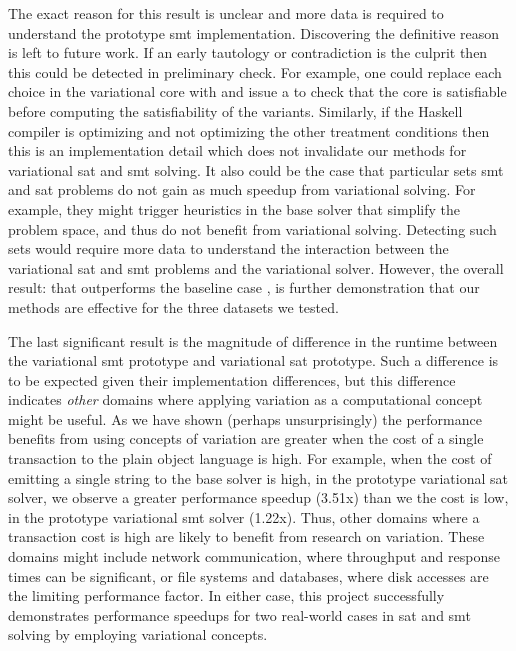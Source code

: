 The exact reason for this result is unclear and more data is required to
understand the prototype \ac{smt} implementation. Discovering the definitive
reason is left to future work. If an early tautology or contradiction is the
culprit then this could be detected in preliminary check. For example, one could
replace each choice in the variational core with \tru{} and issue a
 to check that the core is satisfiable before computing the
satisfiability of the variants. Similarly, if the Haskell compiler is optimizing
\pTov{} and not optimizing the other treatment conditions then this is an
implementation detail which does not invalidate our methods for variational
\ac{sat} and \ac{smt} solving. It also could be the case that particular sets
\ac{smt} and \ac{sat} problems do not gain as much speedup from variational
solving. For example, they might trigger heuristics in the base solver that
simplify the problem space, and thus do not benefit from variational solving.
Detecting such sets would require more data to understand the interaction
between the variational \ac{sat} and \ac{smt} problems and the variational
solver. However, the overall result: that \vTov{} outperforms the baseline case
\vTop{}, is further demonstration that our methods are effective for the three
datasets we tested.

The last significant result is the magnitude of difference in the runtime
between the variational \ac{smt} prototype and variational \ac{sat} prototype.
Such a difference is to be expected given their implementation differences, but
this difference indicates \emph{other} domains where applying variation as a
computational concept might be useful. As we have shown (perhaps unsurprisingly)
the performance benefits from using concepts of variation are greater when the
cost of a single transaction to the plain object language is high. For example,
when the cost of emitting a single string to the base solver is high, \eg{} in
the prototype variational \ac{sat} solver, we observe a greater performance
speedup (3.51x) than we the cost is low, \eg{} in the prototype variational
\ac{smt} solver (1.22x). Thus, other domains where a transaction cost is high
are likely to benefit from research on variation. These domains might include
network communication, where throughput and response times can be significant,
or file systems and databases, where disk accesses are the limiting performance
factor. In either case, this project successfully demonstrates performance
speedups for two real-world cases in \ac{sat} and \ac{smt} solving by employing
variational concepts.
